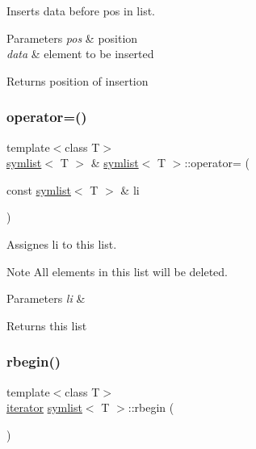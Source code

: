 Inserts {\ttfamily data} before {\ttfamily pos} in list. 


\begin{DoxyParams}{Parameters}
{\em pos} & position \\
\hline
{\em data} & element to be inserted\\
\hline
\end{DoxyParams}
\begin{DoxyReturn}{Returns}
position of insertion 
\end{DoxyReturn}
\mbox{\label{classsymlist_aab326eda0f6d3a78f193a249342670bc}} 
\subsubsection{\texorpdfstring{operator=()}{operator=()}}
{\footnotesize\ttfamily template$<$class T$>$ \\
\mbox{\hyperlink{classsymlist}{symlist}}$<$ T $>$ \& \mbox{\hyperlink{classsymlist}{symlist}}$<$ T $>$\+::operator= (\begin{DoxyParamCaption}\item[{const \mbox{\hyperlink{classsymlist}{symlist}}$<$ T $>$ \&}]{li }\end{DoxyParamCaption})}



Assignes {\ttfamily li} to this list. 

\begin{DoxyNote}{Note}
All elements in this list will be deleted.
\end{DoxyNote}

\begin{DoxyParams}{Parameters}
{\em li} & \\
\hline
\end{DoxyParams}
\begin{DoxyReturn}{Returns}
this list 
\end{DoxyReturn}
\mbox{\label{classsymlist_ae5250e0c0c2bedee285f72584ddce29d}} 
\subsubsection{\texorpdfstring{rbegin()}{rbegin()}\hspace{0.1cm}{\footnotesize\ttfamily [1/2]}}
{\footnotesize\ttfamily template$<$class T$>$ \\
\mbox{\hyperlink{structsymlist__iterator}{iterator}} \mbox{\hyperlink{classsymlist}{symlist}}$<$ T $>$\+::rbegin (\begin{DoxyParamCaption}{ }\end{DoxyParamCaption})\hspace{0.3cm}{\ttfamily [inline]}}



